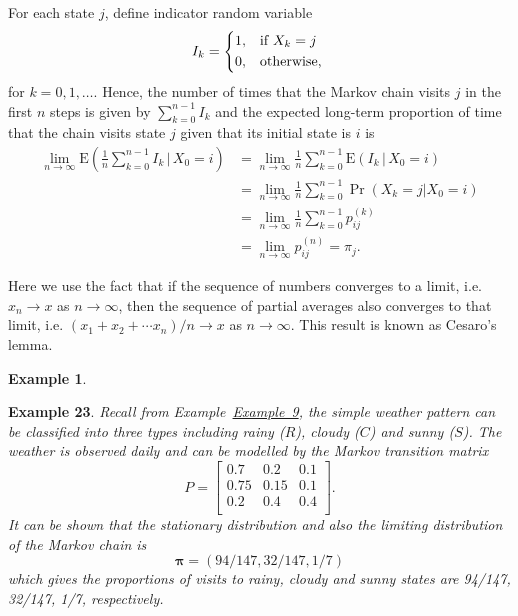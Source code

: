 \documentclass[
]{book}
\theoremstyle{definition}
\theoremstyle{definition}
\newtheorem{example}{Example}[chapter]
\theoremstyle{definition}
\theoremstyle{definition}
\theoremstyle{remark}
\begin{document}
For each state \(j\), define indicator random variable \[I_k =
    \begin{cases*}
      1, & if $X_k = j$ \\
      0,  & otherwise,
    \end{cases*}\] for \(k = 0,1,\ldots\). Hence, the number of times that
the Markov chain visits \(j\) in the first \(n\) steps is given by
\(\sum_{k =0}^{n-1} I_k\) and the expected long-term proportion of time
that the chain visits state \(j\) given that its initial state is \(i\) is
\[\begin{aligned}
    \lim_{n \rightarrow \infty} \mathrm{E}\left(\frac{1}{n}  \sum_{k =0}^{n-1} I_k \, |\, X_0 = i \right) &=
    \lim_{n \rightarrow \infty}  \frac{1}{n}  \sum_{k =0}^{n-1} \mathrm{E}( I_k \, |\, X_0 = i ) \\
    &= \lim_{n \rightarrow \infty}  \frac{1}{n}  \sum_{k =0}^{n-1} \Pr(X_k = j | X_0 = i)\\
    &= \lim_{n \rightarrow \infty}  \frac{1}{n}  \sum_{k =0}^{n-1} p^{(k)}_{ij}\\
    &= \lim_{n \rightarrow \infty}  p^{(n)}_{ij} =  \pi_j.\end{aligned}\]

Here we use the fact that if the sequence of numbers converges to a
limit, i.e.~\(x_n \rightarrow x\) as \(n \rightarrow \infty\), then the
sequence of partial averages also converges to that limit, i.e.
\((x_1 + x_2 + \cdots x_n)/n \rightarrow x\) as \(n \rightarrow \infty\).
This result is known as Cesaro's lemma.

\begin{example}
\protect\hypertarget{exm:weatherExample2}{}\label{exm:weatherExample2}

\textbf{Example 23}. \emph{Recall from
Example~\protect\hyperlink{weather}{Example~9},
the simple weather pattern can be classified into three types including
rainy (\(R\)), cloudy (\(C\)) and sunny (\(S\)). The weather is observed daily
and can be modelled by the Markov transition matrix
\[P = \begin{bmatrix}
    0.7 & 0.2 & 0.1    \\
    0.75 & 0.15 & 0.1   \\
   0.2 & 0.4 & 0.4   \\
\end{bmatrix}.\] It can be shown that the stationary distribution and
also the limiting distribution of the Markov chain is
\[\boldsymbol{\pi} = (94/147, 32/147,    1/7)\] which gives the
proportions of visits to rainy, cloudy and sunny states are 94/147,
32/147, 1/7, respectively.}

\end{example}
\end{document}
